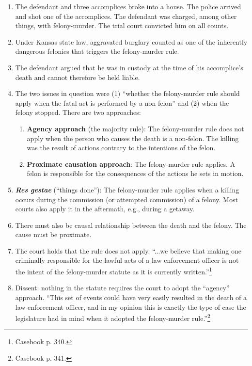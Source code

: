 \begin{enumerate}
    \item The defendant and three accomplices broke into a house. The police 
    arrived and shot one of the accomplices. The defendant was charged, among 
    other things, with felony-murder. The trial court convicted him on all 
    counts.
    \item Under Kansas state law, aggravated burglary counted as one of the 
    inherently dangerous felonies that triggers the felony-murder rule.
    \item The defendant argued that he was in custody at the time of his 
    accomplice's death and cannot therefore be held liable.
    \item The two issues in question were (1) ``whether the felony-murder rule 
    should apply when the fatal act is performed by a non-felon'' and (2) when 
    the felony stopped. There are two approaches:
    \begin{enumerate}
        \item \textbf{Agency approach} (the majority rule): The felony-murder 
        rule does not apply when the person who causes the death is a 
        non-felon. The killing was the result of actions contrary to the 
        intentions of the felon.
        \item \textbf{Proximate causation approach}: The felony-murder rule 
        applies. A felon is responsible for the consequences of the actions he 
        sets in motion.
    \end{enumerate}
    \item \textbf{\emph{Res gestae}} (``things done''): The felony-murder rule 
    applies when a killing occurs during the commission (or attempted 
    commission) of a felony. Most courts also apply it in the aftermath, e.g., 
    during a getaway.
    \item There must also be causal relationship between the death and the 
    felony. The cause must be proximate.
    \item The court holds that the rule does not apply. ``...we believe that 
    making one criminally responsible for the lawful acts of a law enforcement 
    officer is not the intent of the felony-murder statute as it is currently 
    written.''\footnote{Casebook p. 340.}
    \item Dissent: nothing in the statute requires the court to adopt the 
    ``agency'' approach. ``This set of events could have very easily resulted 
    in the death of a law enforcement officer, and in my opinion this is 
    exactly the type of case the legislature had in mind when it adopted the 
    felony-murder rule.''\footnote{Casebook p. 341.}
\end{enumerate}

